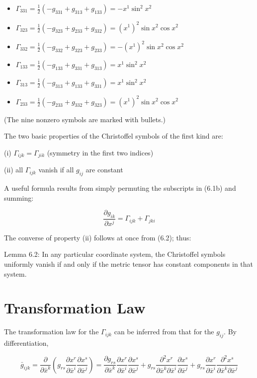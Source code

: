 \documentclass[10pt]{article}
\begin{document}
\begin{itemize}
  \item $\Gamma_{331}=\frac{1}{2}\left(-g_{331}+g_{313}+g_{133}\right)=-x^{1} \sin ^{2} x^{2}$
  \item $\Gamma_{323}=\frac{1}{2}\left(-g_{323}+g_{233}+g_{332}\right)=\left(x^{1}\right)^{2} \sin x^{2} \cos x^{2}$
  \item $\Gamma_{332}=\frac{1}{2}\left(-g_{332}+g_{323}+g_{233}\right)=-\left(x^{1}\right)^{2} \sin x^{2} \cos x^{2}$
  \item $\Gamma_{133}=\frac{1}{2}\left(-g_{133}+g_{331}+g_{313}\right)=x^{1} \sin ^{2} x^{2}$
  \item $\Gamma_{313}=\frac{1}{2}\left(-g_{313}+g_{133}+g_{331}\right)=x^{1} \sin ^{2} x^{2}$
  \item $\Gamma_{233}=\frac{1}{2}\left(-g_{233}+g_{332}+g_{323}\right)=\left(x^{1}\right)^{2} \sin x^{2} \cos x^{2}$
\end{itemize}

(The nine nonzero symbols are marked with bullets.)

The two basic properties of the Christoffel symbols of the first kind are:

(i) $\Gamma_{i j k}=\Gamma_{j i k}$ (symmetry in the first two indices)

(ii) all $\Gamma_{i j k}$ vanish if all $g_{i j}$ are constant

A useful formula results from simply permuting the subscripts in (6.1b) and summing:


\begin{equation*}
\frac{\partial g_{i k}}{\partial x^{j}}=\Gamma_{i j k}+\Gamma_{j k i} \tag{6.2}
\end{equation*}


The converse of property (ii) follows at once from (6.2); thus:

Lemma 6.2: In any particular coordinate system, the Christoffel symbols uniformly vanish if and only if the metric tensor has constant components in that system.

\section*{Transformation Law}
The transformation law for the $\Gamma_{i j k}$ can be inferred from that for the $g_{i j}$. By differentiation,

$$
\bar{g}_{i j k}=\frac{\partial}{\partial \bar{x}^{k}}\left(g_{r s} \frac{\partial x^{r}}{\partial \bar{x}^{i}} \frac{\partial x^{s}}{\partial \bar{x}^{j}}\right)=\frac{\partial g_{r s}}{\partial \bar{x}^{k}} \frac{\partial x^{r}}{\partial \bar{x}^{i}} \frac{\partial x^{s}}{\partial \bar{x}^{j}}+g_{r s} \frac{\partial^{2} x^{r}}{\partial \bar{x}^{k} \partial \bar{x}^{i}} \frac{\partial x^{s}}{\partial \bar{x}^{j}}+g_{r s} \frac{\partial x^{r}}{\partial \bar{x}^{i}} \frac{\partial^{2} x^{s}}{\partial \bar{x}^{k} \partial \bar{x}^{j}}
$$
\end{document}
